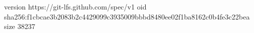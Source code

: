 version https://git-lfs.github.com/spec/v1
oid sha256:f1cbcae3b2083b2c4429099c3935009bbbd8480ee02f1ba8162c0b4fe3c22bea
size 38237
